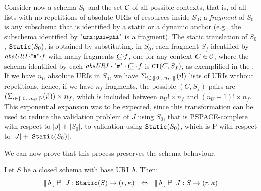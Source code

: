 Consider now a schema $S_0$ and the set $\mathcal{C}$ of all possible contexts, that is,
of all lists with no repetitions of absolute URIs of resources inside $S_0$;
a \emph{fragment} of $S_0$ is any subschema that is identified by a static or a dynamic anchor
(e.g., the subschema identified by $\qkw{urn:phi\#phi}$ is a fragment).
The static translation of $S_0$, ${\tt Static}(S_0)$, is obtained by substituting, 
in $S_0$,  each fragment 
$S_f$ identified by $\key{absURI}\catHash\key{f}$ with many fragments $\underline{C}\!\cdot\!\mathit{f}$, 
one for any context $C\in\mathcal{C}$, where the schema identified by each $\key{absURI}\lcatHash\ECC\lcat\key{f}$ is
${\tt CI}(C,S_f)$, as exemplified in the {\FV}. 
If we have $n_U$ absolute URIs in $S_0$, we have
$\Sigma_{i\in\{\!|\,{{0}\ldots{n_U}}\,|\!\}}(i!)$ lists of URIs without repetitions, hence, if we have $n_f$ fragments, 
the possible $(C,S_f)$ pairs are $(\Sigma_{i\in\{\!|\,{{0}\ldots{n_U}}\,|\!\}}(i!))\times n_f$, which is
included between $n_U!\times n_f$ and $(n_U+1)!\times n_f$.
This exponential expansion was to be expected, since this transformation can be used to reduce the validation problem
of $J$ using $S_0$, 
that is PSPACE-complete with respect to $|J|+|S_0|$, to validation using ${\tt Static}(S_0)$, which is P with respect to
$|J|+|{\tt Static}(S_0)|$.

We can now prove that this process preserves the schema behaviour. %


\begin{theoremrep}
Let $S$ be a closed schema with base URI $\mathit{b}$.
Then:
$$\SJudg{\List{\key{b}}}{J}{\StG(S)}\Ret{r}{(r,\ps)}\ \ \Iff\ \ \SJudg{\List{\key{b}}}{J}{S}\Ret{r}{(r,\ps)}$$
\end{theoremrep}


